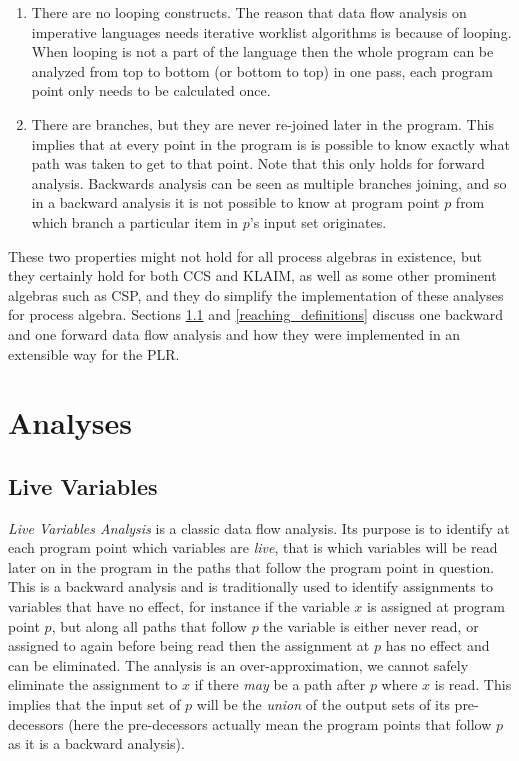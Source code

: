	\begin{enumerate}
		\item There are no looping constructs. The reason that data flow analysis 
		on imperative languages needs iterative worklist algorithms is because of 
		looping. When looping is not a part of the language then the whole program 
		can be analyzed from top to bottom (or bottom to top) in one pass, each 
		program point only needs to be calculated once.
		
		\item There are branches, but they are never re-joined later in the 
		program. This implies that at every point in the program is is possible to 
		know exactly what path was taken to get to that point. Note that this only 
		holds for forward analysis. Backwards analysis can be seen as multiple 
		branches joining, and so in a backward analysis it is not possible to know 
		at program point $p$ from which branch a particular item in $p$'s input 
		set originates.
		
	\end{enumerate}

	These two properties might not hold for all process algebras in existence, 
	but they certainly hold for both CCS and KLAIM, as well as some other 
	prominent algebras such as CSP, and they do simplify the implementation of 
	these analyses for process algebra. Sections \ref{live_variables} and 
	\ref{reaching_definitions} discuss one backward and one forward data flow 
	analysis and how they were implemented in an extensible way for the PLR.
	
\section{Analyses}

\subsection{Live Variables}\label{live_variables}

  \textit{Live Variables Analysis} is a classic data flow analysis. Its purpose 
  is to identify at each program point which variables are \textit{live}, that 
  is which variables will be read later on in the program in the paths that 
  follow the program point in question. This is a backward analysis and is 
  traditionally used to identify assignments to variables that have no effect,
  for instance if the variable $x$ is assigned at program point $p$, but along 
  all paths that follow $p$ the variable is either never read, or assigned to 
  again before being read then the assignment at $p$ has no effect and can be 
  eliminated. The analysis is an over-approximation, we cannot safely eliminate 
  the assignment to $x$ if there \textit{may} be a path after $p$ where $x$ is
  read. This implies that the input set of $p$ will be the \textit{union} of the
  output sets of its pre-decessors (here the pre-decessors actually mean the 
  program points that follow $p$ as it is a backward analysis).
  
